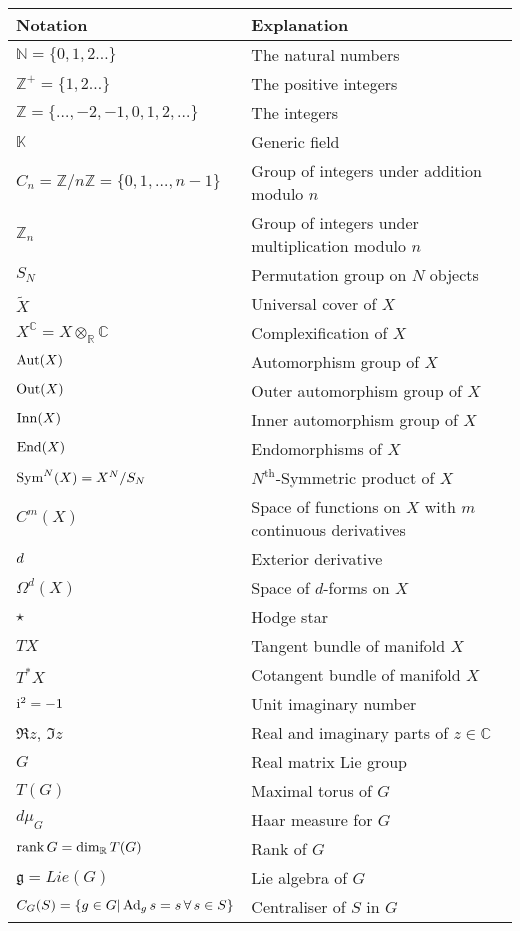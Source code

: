 \begin{center}
\small
\begin{tabular}{ p{5.5cm} p{8.5cm} }
Notation & Explanation\\
\hline
$\mathbb{N}=\{0,1,2\dots\}$ &The natural numbers\\
$\mathbb{Z}^+=\{1,2\dots\}$ &The positive integers\\
$\mathbb{Z}=\{\dots,-2,-1,0,1,2,\dots\}$ & The integers\\
$\mathbb{K}$ &Generic field\\
$C_n=\mathbb{Z}/n\mathbb{Z}=\{0,1,\dots,n-1\}$ & Group of integers under addition modulo $n$\\
$\mathbb{Z}_n$ & Group of integers under multiplication modulo $n$\\
$S_N$&Permutation group on $N$ objects\\
\hline
$\widetilde{X}$&Universal cover of $X$\\
$X^{\mathbb{C}}=X\otimes_{\mathbb{R}}\mathbb{C}$ &Complexification of $X$\\
$\operatorname{Aut}(X)$&Automorphism group of $X$\\
$\operatorname{Out}(X)$&Outer automorphism group of $X$\\
$\operatorname{Inn}(X)$&Inner automorphism group of $X$\\
$\operatorname{End}(X)$&Endomorphisms of $X$\\
$\operatorname{Sym}^N(X)=X^N/S_N$&$N^{\text{th}}$-Symmetric product of $X$\\
$C^m(X)$ &Space of functions on $X$ with $m$ continuous derivatives \\
$d$&Exterior derivative\\
$\Omega^d(X)$ &Space of $d$-forms on $X$\\
$\star$&Hodge star\\
$TX$& Tangent bundle of manifold $X$\\
$T^*X$& Cotangent bundle of manifold $X$\\
\hline
$\mathrm{i}^2=-1$&Unit imaginary number\\
$\Re z$, $\Im z$& Real and imaginary parts of $z\in\mathbb{C}$\\\hline
 $G$ & Real matrix Lie group\\
 $T(G)$ & Maximal torus of $G$\\
 $d\mu_G$ & Haar measure for $G$\\
 $\operatorname{rank} G=\dim_{\mathbb{R}} T(G)$& Rank of $G$\\
 $\mathfrak{g}=Lie(G)$&Lie algebra of $G$\\
 $C_{G}(S)=\{g\in G|\operatorname{Ad}_gs=s\,\forall\,s\in S\}$ & Centraliser of $S$ in $G$\\

\end{tabular}
\end{center}
